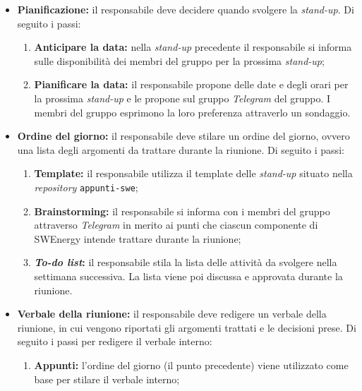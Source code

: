\begin{itemize}

	\item \textbf{Pianificazione:} il responsabile deve decidere quando
	      svolgere la \textit{stand-up}. Di seguito i passi:
	      \begin{enumerate}
		      \item \textbf{Anticipare la data:} nella \textit{stand-up}
		            precedente il responsabile si informa sulle disponibilità
		            dei membri del gruppo per la prossima \textit{stand-up};

		      \item \textbf{Pianificare la data:} il responsabile propone delle
		            date e degli orari per la prossima \textit{stand-up} e le
		            propone sul gruppo \textit{Telegram} del gruppo. I membri
		            del gruppo esprimono la loro preferenza attraverlo un
		            sondaggio.
	      \end{enumerate}

	\item \textbf{Ordine del giorno:} il responsabile deve stilare un ordine del
	      giorno, ovvero una lista degli argomenti da trattare durante la
	      riunione. Di seguito i passi:
	      \begin{enumerate}
		      \item \textbf{Template:} il responsabile utilizza il template
		            delle \textit{stand-up} situato nella \textit{repository}
		            \texttt{appunti-swe};

		      \item \textbf{Brainstorming:} il responsabile si informa con i
		            membri del gruppo attraverso \textit{Telegram} in merito ai
		            punti che ciascun componente di SWEnergy intende trattare
		            durante la riunione;

		      \item \textbf{\textit{To-do list}:} il responsabile stila la lista
		            delle attività da svolgere nella settimana successiva. La
		            lista viene poi discussa e approvata durante la riunione.
	      \end{enumerate}

	\item \textbf{Verbale della riunione:} il responsabile deve redigere un
	      verbale della riunione, in cui vengono riportati gli argomenti
	      trattati e le decisioni prese. Di seguito i passi per redigere il
	      verbale interno:
	      \begin{enumerate}
		      \item \textbf{Appunti:} l'ordine del giorno (il punto precedente)
		            viene utilizzato come base per stilare il verbale interno;


\end{enumerate}
\end{itemize}
